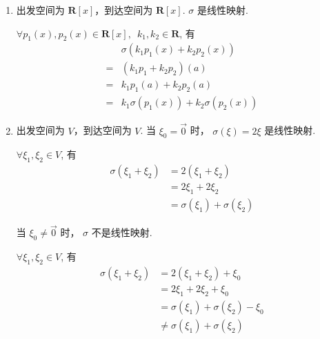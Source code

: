 \documentclass[12pt,fontset=fandol]{ctexart}
\begin{document}
\begin{solve}
\begin{enumerate}
        \item 出发空间为 $ \mathbf{R}[x] $，到达空间为 $ \mathbf{R}[x] $. $ \sigma $ 是线性映射.

              $ \forall p_1(x), p_2(x) \in \mathbf{R}[x],\enspace k_1, k_2 \in \mathbf{R} $, 有
              \begin{align*}
                      & \sigma(k_1 p_1(x) + k_2 p_2(x))         \\
                  ={} & (k_1 p_1 + k_2 p_2)(a)                  \\
                  ={} & k_1 p_1(a) + k_2 p_2(a)                 \\
                  ={} & k_1 \sigma(p_1(x)) + k_2 \sigma(p_2(x))
              \end{align*}

        \item 出发空间为 $ V $，到达空间为 $ V $. 当 $ \xi_0 = \vec{0} $ 时， $ \sigma(\xi) = 2 \xi $ 是线性映射.

              $ \forall \xi_1, \xi_2 \in V $, 有
              \begin{align*}
                  \sigma(\xi_1 + \xi_2) & = 2(\xi_1 + \xi_2)              \\
                                        & = 2 \xi_1 + 2 \xi_2             \\
                                        & = \sigma(\xi_1) + \sigma(\xi_2)
              \end{align*}

              当 $ \xi_0 \neq \vec{0} $ 时， $ \sigma $ 不是线性映射.

              $ \forall \xi_1, \xi_2 \in V $, 有
              \begin{align*}
                  \sigma(\xi_1 + \xi_2) & = 2(\xi_1 + \xi_2) + \xi_0              \\
                                        & = 2 \xi_1 + 2 \xi_2 + \xi_0             \\
                                        & = \sigma(\xi_1) + \sigma(\xi_2) - \xi_0 \\
                                        & \neq \sigma(\xi_1) + \sigma(\xi_2)
              \end{align*}
    \end{enumerate}
\end{solve}
\end{document}

